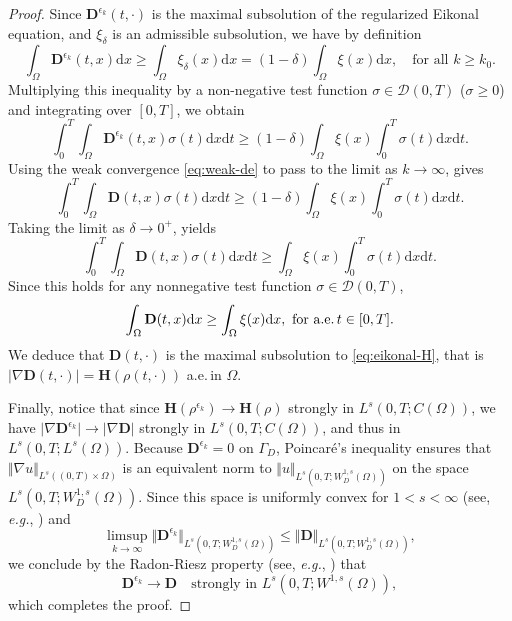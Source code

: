 \documentclass[final,reqno]{amsart}
\theoremstyle{plain}
\theoremstyle{definition}
\theoremstyle{remark}
\numberwithin{remark}{section}	%
\numberwithin{example}{section}	%
\newcommand{\de}{\mathbf{D}}
\newcommand{\he}{\mathbf{H}}
\newcommand{\D}{\mathcal D}
\newcommand{\pp}{a.e.\,}
\newcommand{\dd}{\mathrm{d}}
\begin{document}
\begin{proof}
    Since $\de^{\epsilon_k}(t, \cdot)$ is the maximal subsolution of the regularized Eikonal equation, and $\xi_\delta$ is an admissible subsolution, we have by definition
    \[
        \int_{\Omega} \de^{\epsilon_k}(t,x) \dd x \ge \int_{\Omega} \xi_\delta(x) \dd x = (1-\delta) \int_{\Omega} \xi(x) \dd x, \quad \text{for all } k \ge k_0.
    \]
    Multiplying this inequality by a non-negative test function $\sigma \in \D(0,T)$ ($\sigma \ge 0$) and integrating over $[0,T]$, we obtain
    \[
        \int_{0}^{T} \int_{\Omega} \de^{\epsilon_k}(t,x) \sigma(t) \dd x \dd t \ge (1-\delta) \int_{\Omega} \xi(x) \int_{0}^{T} \sigma(t) \dd x \dd t.
    \]
    Using the weak convergence \eqref{eq:weak-de} to pass to the limit as $k \to \infty$, gives 
    \[
        \int_{0}^{T} \int_{\Omega} \de(t,x) \sigma(t) \dd x \dd t \ge (1-\delta) \int_{\Omega} \xi(x) \int_{0}^{T} \sigma(t) \dd x \dd t.
    \]
    Taking the limit as $\delta \to 0^+$, yields
    \[
        \int_{0}^{T} \int_{\Omega} \de(t,x) \sigma(t) \dd x \dd t \ge \int_{\Omega} \xi(x) \int_{0}^{T} \sigma(t) \dd x \dd t.
    \]
    Since this holds for any nonnegative test function $\sigma \in \D(0,T)$, 
    \[
        \int_{\Omega} \de(t,x) \dd x \ge \int_{\Omega} \xi(x) \dd x,~\text{for \pp } t\in [0,T].
    \]
    We deduce that $\de(t, \cdot)$ is the maximal subsolution to \eqref{eq:eikonal-H}, that is  $\vert\nabla \de(t, \cdot)\vert = \he(\rho(t, \cdot))$ \pp in $\Omega$. 
    
    Finally, notice that since $\he(\rho^{\epsilon_k}) \to \he(\rho)$ strongly in $L^s(0,T; C(\Omega))$, we have $\vert\nabla \de^{\epsilon_k}\vert \to \vert\nabla \de\vert$ strongly in $L^s(0,T; C(\Omega))$, and thus in $L^s(0,T; L^s(\Omega))$. Because $\de^{\epsilon_k} = 0$ on $\Gamma_D$, Poincaré's inequality ensures that $\Vert\nabla u \Vert_{L^s((0,T)\times\Omega)}$ is an equivalent norm to $\Vert u\Vert_{L^s(0,T; W^{1,s}_D(\Omega))}$ on the space $L^s(0,T; W^{1,s}_D(\Omega))$. Since this space is uniformly convex for $1 < s < \infty$ (see, \textit{e.g.}, \cite[Theorem 3.6]{Adam&Fournier}) and 
    \[
        \limsup_{k \to \infty} \Vert\de^{\epsilon_k}\Vert_{L^s(0,T; W^{1,s}_D(\Omega))} \leq \Vert \de\Vert_{L^s(0,T; W^{1,s}_D(\Omega))},
    \]
    we conclude by the Radon-Riesz property (see, \textit{e.g.}, \cite[Proposition 3.32]{brezis-FASSPDE}) that 
    \[
        \de^{\epsilon_k} \to \de \quad \text{strongly in } L^s(0,T; W^{1,s}(\Omega)),
    \]
    which completes the proof.
   \end{proof}
\end{document}
